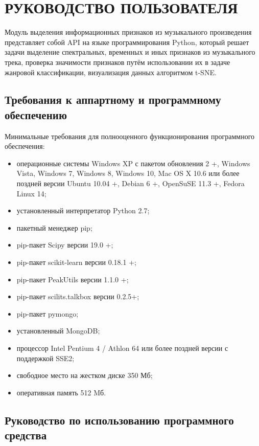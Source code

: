 \section{РУКОВОДСТВО ПОЛЬЗОВАТЕЛЯ}
\label{sec:manual}

Модуль выделения информационных признаков из музыкального произведения представляет собой API на языке программирования Python, который решает задачи выделение спектральных, временных и иных признаков из музыкального трека, проверка значимости признаков путём использовании их в задаче жанровой классификации, визуализация данных алгоритмом t-SNE.


\subsection{Требования к аппартному и программному обеспечению}
\label{sub:manual:sys}

Минимальные требования для полнооценного функционирования программного обеспечения:

\begin{itemize}
\item операционные системы Windows XP с пакетом обновления 2 +, Windows Vista, Windows 7, Windows 8, Windows 10, Mac OS X 10.6 или более поздней версии Ubuntu 10.04 +, Debian 6 +, OpenSuSE 11.3 +, Fedora Linux 14;
\item установленный интерпретатор Python 2.7;
\item пакетный менеджер pip;
\item pip-пакет Scipy версии 19.0 +;
\item pip-пакет scikit-learn версии 0.18.1 +; 
\item pip-пакет PeakUtils  версии 1.1.0 +;
\item pip-пакет scilits.talkbox версии 0.2.5+;
\item pip-пакет pymongo;
\item установленный MongoDB;
\item процессор Intel Pentium 4 / Athlon 64 или более поздней версии с поддержкой SSE2;
\item свободное место на жестком диске 350 Мб;
\item оперативная память 512 Mб.
\end{itemize}


\subsection{Руководство по использованию программного средства}
\label{sub:manual:us}